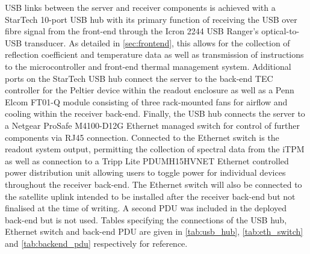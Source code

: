 USB links between the server and receiver components is achieved with a StarTech 10-port USB hub with its primary function of receiving the USB over fibre signal from the front-end through the Icron 2244 USB Ranger’s optical-to-USB transducer. As detailed in \cref{sec:frontend}, this allows for the collection of reflection coefficient and temperature data as well as transmission of instructions to the microcontroller and front-end thermal management system. Additional ports on the StarTech USB hub connect the server to the back-end TEC controller for the Peltier device within the readout enclosure as well as a Penn Elcom FT01-Q module consisting of three rack-mounted fans for airflow and cooling within the receiver back-end. Finally, the USB hub connects the server to a Netgear ProSafe M4100-D12G Ethernet managed switch for control of further components via RJ45 connection. Connected to the Ethernet switch is the readout system output, permitting the collection of spectral data from the iTPM as well as connection to a Tripp Lite PDUMH15HVNET Ethernet controlled power distribution unit allowing users to toggle power for individual devices throughout the receiver back-end. The Ethernet switch will also be connected to the satellite uplink intended to be installed after the receiver back-end but not finalised at the time of writing. A second PDU was included in the deployed back-end but is not used. Tables specifying the connections of the USB hub, Ethernet switch and back-end PDU are given in \cref{tab:usb_hub}, \cref{tab:eth_switch} and \cref{tab:backend_pdu} respectively for reference.


